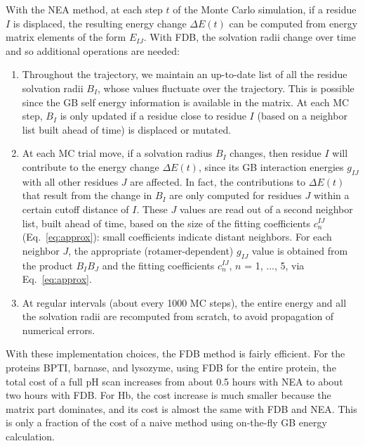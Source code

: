 \documentclass[a4paper,12pt]{article}
\begin{document}
With the NEA method, at each step $t$ of the Monte Carlo simulation, if a residue $I$ is displaced, the resulting energy change
$\Delta E(t)$ can be computed from energy matrix elements of the form $E_{IJ}$. With FDB, the solvation radii change over time
and so additional operations are needed:
\begin{enumerate}
\item Throughout the trajectory, we maintain an up-to-date list of all the residue solvation radii $B_I$, whose values fluctuate
over the trajectory. This is possible since the GB self energy information is available in the matrix. At each MC step, $B_I$ is
only updated if a residue close to residue $I$ (based on a neighbor list built ahead of time) is displaced or mutated.

\item At each MC trial move, if a solvation radius $B_I$ changes, then residue $I$ will contribute to the energy change
$\Delta E(t)$, since its GB interaction energies $g_{IJ}$ with all other residues $J$ are affected. In fact, the contributions
to $\Delta E(t)$ that result from the change in $B_I$ are only computed for residues $J$ within a certain cutoff distance of
$I$. These $J$ values are read out of a second neighbor list, built ahead of time, based on the size of the fitting coefficients
$c_n^{IJ}$ (Eq.\ \ref{eq:approx}): small coefficients indicate distant neighbors. For each neighbor $J$, the appropriate
(rotamer-dependent)  $g_{IJ}$ value is obtained from the product $B_I B_J$ and the fitting coefficients $c_n^{IJ}$, $n$ =
1, ..., 5, via Eq.\ \ref{eq:approx}. 
\item At regular intervals (about every 1000 MC steps), the entire energy and all the solvation radii are recomputed from scratch,
to avoid propagation of numerical errors. 
\end{enumerate}

With these implementation choices, the FDB method is fairly efficient. For the proteins BPTI, barnase, and lysozyme, using FDB
for the entire protein, the total cost of a full pH scan increases from about 0.5 hours with NEA to about two hours with FDB.
For Hb, the cost increase is much smaller because the matrix part dominates, and its cost is almost the same with FDB and NEA.
This is only a fraction of the cost of a naive method using on-the-fly GB energy calculation.
\end{document}

